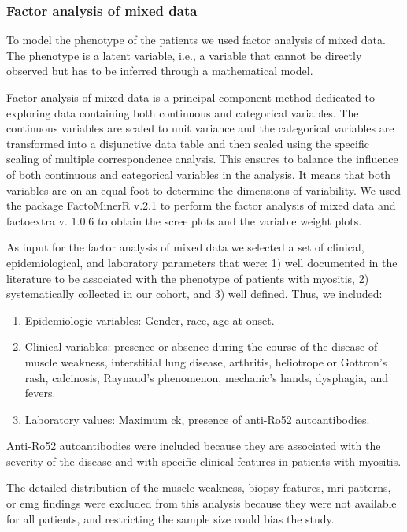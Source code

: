 \subsubsection{Factor analysis of mixed data}
To model the phenotype of the patients we used factor analysis of mixed data. The phenotype is a latent variable, i.e., a variable that cannot be directly observed but has to be inferred through a mathematical model.

Factor analysis of mixed data is a principal component method dedicated to exploring data containing both continuous and categorical variables. The continuous variables are scaled to unit variance and the categorical variables are transformed into a disjunctive data table and then scaled using the specific scaling of multiple correspondence analysis. This ensures to balance the influence of both continuous and categorical variables in the analysis. It means that both variables are on an equal foot to determine the dimensions of variability. We used the package FactoMinerR v.2.1 to perform the factor analysis of mixed data and factoextra v. 1.0.6 to obtain the scree plots and the variable weight plots.

As input for the factor analysis of mixed data we selected a set of clinical, epidemiological, and laboratory parameters that were: 1) well documented in the literature to be associated with the phenotype of patients with myositis, 2) systematically collected in our cohort, and 3) well defined. Thus, we included:

\begin{enumerate}
	\item Epidemiologic variables: Gender, race, age at onset.
	
	\item Clinical variables: presence or absence during the course of the disease of muscle weakness, interstitial lung disease, arthritis, heliotrope or Gottron’s rash, calcinosis, Raynaud’s phenomenon, mechanic’s hands, dysphagia, and fevers.
	
	\item Laboratory values: Maximum \gls{ck}, presence of anti-Ro52 autoantibodies.
\end{enumerate}

Anti-Ro52 autoantibodies were included because they are associated with the severity of the disease and with specific clinical features in patients with myositis.\cite{PinalFernandez2017a,Vancsa2009,Marie2012,Bauhammer2016}

The detailed distribution of the muscle weakness, biopsy features, \gls{mri} patterns, or \gls{emg} findings were excluded from this analysis because they were not available for all patients, and restricting the sample size could bias the study.

